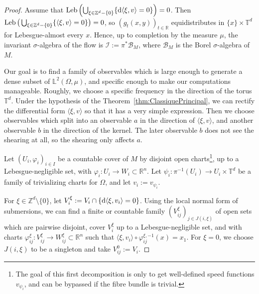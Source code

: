 \documentclass[AHL,Unicode,longabstracts]{cedram}
\DeclareMathOperator{\Leb}{Leb}
\newcommand{\Z}{\mathbb{Z}}
\newcommand{\R}{\mathbb{R}}
\newcommand{\Lbb}{\mathbb{L}}
\newcommand{\Tbb}{\mathbb{T}}
\newcommand{\Bcal}{\mathcal{B}}
\newcommand{\Ical}{\mathcal{I}}
\newcommand{\de}{{\rm d}}
\begin{document}
\begin{proof}
Assume that $\Leb \left(\bigcup_{\xi \in \Z^d - \{0\}} \{ \de \langle \xi, v \rangle = 0\}\right) = 0$. Then $\Leb \big(\bigcup_{\xi \in \Z^d - \{0\}} \{ \langle \xi,\linebreak v \rangle= 0\}\big)= 0$, so $(g_t (x,y))_{t \in \R}$ equidistributes in $\{x\} \times \Tbb^d$ for Lebesgue-almost every $x$. Hence, up to completion by the measure $\mu$, the invariant $\sigma$-algebra of the flow is $\Ical := \pi^* \Bcal_M$, where $\Bcal_M$ is the Borel $\sigma$-algebra of $M$.


Our goal is to find a family of observables which is large enough to generate a dense subset of $\Lbb^2 (\Omega, \mu)$, and specific enough to make our computations manageable. Roughly, we choose a specific frequency in the direction of the torus $\Tbb^d$. Under the hypothesis of the Theorem~\ref{thm:ClassiquePrincipal}, we can rectify the differential form $\langle \xi, v \rangle$ so that it has a very simple expression. Then we choose observables which split into an observable $a$ in the direction of $\langle \xi, v \rangle$, and another observable $b$ in the direction of the kernel. The later observable $b$ does not see the shearing at all, so the shearing only affects $a$.


Let $(U_i, \varphi_i)_{i \in I}$ be a countable cover of $M$ by disjoint open charts\footnote{The goal of this first decomposition is only to get well-defined speed functions $v_{\psi_i}$, and can be bypassed if the fibre bundle is trivial.}, up to a Lebesgue-negligible set, with $\varphi_i : U_i
\to W_i \subset \R^n$. Let $\psi_i : \pi^{-1} (U_i) \to U_i \times \Tbb^d$ be a family of trivializing charts for $\Omega$, and let $v_i := v_{\psi_i}$.


For $\xi \in \Z^d \setminus \{0\}$, let $V_i^\xi := V_i \cap \{ \de \langle \xi, v_i \rangle = 0\}$. Using the local normal form of submersions, we can find a finite or countable family $(V_{ij}^\xi)_{j \in J(i,\xi)}$ of open sets which are pairwise disjoint, cover $V_i^\xi$ up to a Lebesgue-negligible set, and with charts $\varphi_{ij}^\xi : V_{ij}^\xi \to W_{ij}^\xi \subset \R^n$ such that $\langle \xi, v_i \rangle \circ \varphi_{ij}^{\xi,-1} (x) = x_1$. For $\xi=0$, we choose $J(i,\xi)$ to be a singleton and take $V_{ij}^0:=V_i$.



\end{proof}
\end{document}
